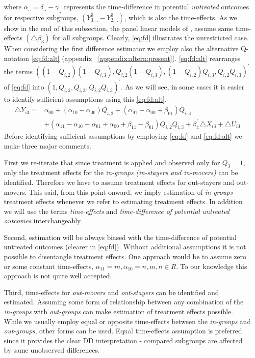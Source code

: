 \documentclass[12pt]{article}
\begin{document}
where $\alpha_{..}=\delta_{..}-\gamma_{..}$ represents the time-difference in potential \textit{untreated} outcomes for respective subgroups, $(Y_{3,..}^0-Y_{2,..}^0)$, which is also the time-effects. As we show in the end of this subsection, the panel linear models of \cite{lee2014difference}, assume same time-effects $(\triangle \beta_3)$ for all subgroups. Clearly, \ref{eq:fd} illustrates the unrestricted case. When considering the first difference estimator we employ also the alternative Q-notation \vref{eq:fd:alt} (appendix ~\ref{appendix:altern:present}). \ref{eq:fd:alt} rearranges the terms $((1-Q_{i,2})(1-Q_{i,3}),Q_{i,2}(1-Q_{i,3}),(1-Q_{i,2})Q_{i,3},Q_{i,2}Q_{i,3})^\prime$ of \ref{eq:fd} into  $(1,Q_{i,2},Q_{i,3},Q_{i,2}Q_{i,3})^\prime$. As we will see, in some cases it is easier to identify sufficient assumptions using this \ref{eq:fd:alt}.
\begin{equation}
\label{eq:fd:alt}
\tag{$FD_2$}
\begin{split}
\triangle Y_{i3} = &  \alpha_{00} + (\alpha_{10}-\alpha_{00})Q_{i,2} + (\alpha_{01}-\alpha_{00}+\beta_{01})Q_{i,3}  \\
& + (\alpha_{11}-\alpha_{10}-\alpha_{01} +\alpha_{00}+\beta_{11}-\beta_{01})Q_{i,2}Q_{i,3}+\beta_x^\prime \triangle X_{i3} + \triangle U_{i3} 
\end{split}
\end{equation}
Before identifying sufficient assumptions by employing \ref{eq:fd} and \ref{eq:fd:alt} we make three major comments. 

First we re-iterate that since treatment is applied and observed only for $Q_3=1$, only the treatment effects for the \textit{in-groups (in-stayers and in-movers)} can be identified. Therefore we have to assume treatment effects for out-stayers and out-movers. This said, from this point onward, we imply estimation of \textit{in-groups} treatment effects whenever we refer to estimating treatment effects. In addition we will use the terms \textit{time-effects} and \textit{time-difference of potential untreated outcomes} interchangeably. 

Second, estimation will be always biased with the time-difference of potential untreated outcomes (clearer in \ref{eq:fd}). Without additional assumptions it is not possible to disentangle treatment effects. One approach would be to assume zero or some constant time-effects, $\alpha_{11}= m, \alpha_{10}=n, m,n \in R$. To our knowledge this approach is not quite well accepted. 

Third, time-effects for \textit{out-movers} and \textit{out-stayers} can be identified and estimated. Assuming some form of relationship between any combination of the \textit{in-groups} with \textit{out-groups} can make estimation of treatment effects possible. While we usually employ equal or opposite time-effects between the \textit{in-groups} and \textit{out-groups}, other forms can be used. Equal time-effects assumption is preferred since it provides the clear DD interpretation - compared subgroups are affected by same unobserved differences.
\end{document}
